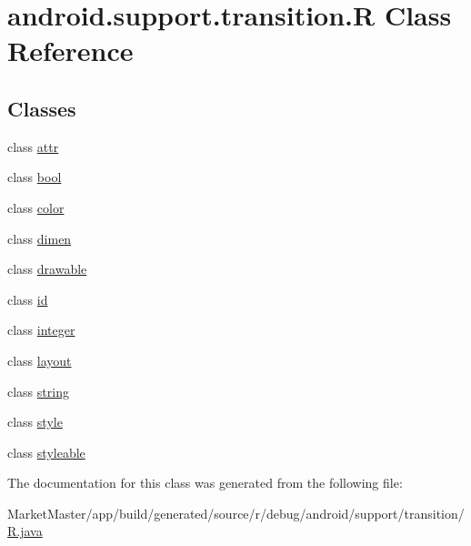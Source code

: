 \hypertarget{classandroid_1_1support_1_1transition_1_1R}{}\section{android.\+support.\+transition.\+R Class Reference}
\label{classandroid_1_1support_1_1transition_1_1R}
\subsection*{Classes}
\begin{DoxyCompactItemize}
\item 
class \mbox{\hyperlink{classandroid_1_1support_1_1transition_1_1R_1_1attr}{attr}}
\item 
class \mbox{\hyperlink{classandroid_1_1support_1_1transition_1_1R_1_1bool}{bool}}
\item 
class \mbox{\hyperlink{classandroid_1_1support_1_1transition_1_1R_1_1color}{color}}
\item 
class \mbox{\hyperlink{classandroid_1_1support_1_1transition_1_1R_1_1dimen}{dimen}}
\item 
class \mbox{\hyperlink{classandroid_1_1support_1_1transition_1_1R_1_1drawable}{drawable}}
\item 
class \mbox{\hyperlink{classandroid_1_1support_1_1transition_1_1R_1_1id}{id}}
\item 
class \mbox{\hyperlink{classandroid_1_1support_1_1transition_1_1R_1_1integer}{integer}}
\item 
class \mbox{\hyperlink{classandroid_1_1support_1_1transition_1_1R_1_1layout}{layout}}
\item 
class \mbox{\hyperlink{classandroid_1_1support_1_1transition_1_1R_1_1string}{string}}
\item 
class \mbox{\hyperlink{classandroid_1_1support_1_1transition_1_1R_1_1style}{style}}
\item 
class \mbox{\hyperlink{classandroid_1_1support_1_1transition_1_1R_1_1styleable}{styleable}}
\end{DoxyCompactItemize}


The documentation for this class was generated from the following file\+:\begin{DoxyCompactItemize}
\item 
Market\+Master/app/build/generated/source/r/debug/android/support/transition/\mbox{\hyperlink{debug_2android_2support_2transition_2R_8java}{R.\+java}}\end{DoxyCompactItemize}

